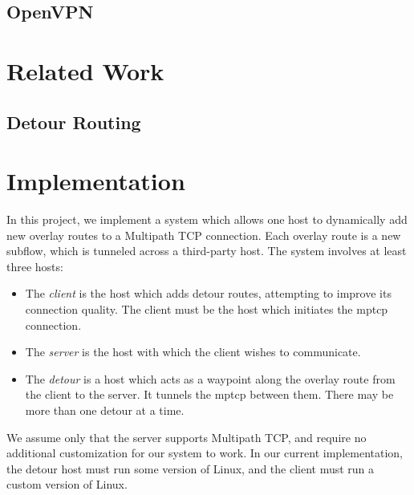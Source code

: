 \documentclass{cwru}
\begin{document}
\section{OpenVPN}


\chapter{Related Work}
\section{Detour Routing}


\chapter{Implementation}


In this project, we implement a system which allows one host to dynamically add
new overlay routes to a Multipath TCP connection. Each overlay route is a new
subflow, which is tunneled across a third-party host. The system involves at
least three hosts:
\begin{itemize}
\item The \emph{client} is the host which adds detour routes, attempting to
  improve its connection quality. The client must be the host which initiates
  the \ac{mptcp} connection.
\item The \emph{server} is the host with which the client wishes to communicate.
\item The \emph{detour} is a host which acts as a waypoint along the overlay
  route from the client to the server. It tunnels the \ac{mptcp} between them. There
  may be more than one detour at a time.
\end{itemize}

We assume only that the server supports Multipath TCP, and require no additional
customization for our system to work. In our current implementation, the detour
host must run some version of Linux, and the client must run a custom version of
Linux.
\end{document}
